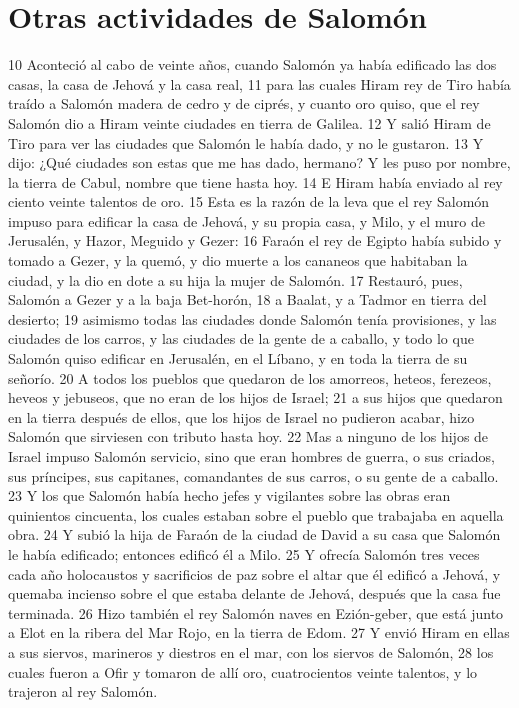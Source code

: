 \section*{Otras actividades de Salomón}

 
10 Aconteció al cabo de veinte años, cuando Salomón ya había edificado las dos casas, la casa de Jehová y la casa real,
11 para las cuales Hiram rey de Tiro había traído a Salomón madera de cedro y de ciprés, y cuanto oro quiso, que el rey Salomón dio a Hiram veinte ciudades en tierra de Galilea.
12 Y salió Hiram de Tiro para ver las ciudades que Salomón le había dado, y no le gustaron.
13 Y dijo: ¿Qué ciudades son estas que me has dado, hermano? Y les puso por nombre, la tierra de Cabul, nombre que tiene hasta hoy.
14 E Hiram había enviado al rey ciento veinte talentos   de oro.
15 Esta es la razón de la leva que el rey Salomón impuso para edificar la casa de Jehová, y su propia casa, y Milo, y el muro de Jerusalén, y Hazor, Meguido y Gezer:
16 Faraón el rey de Egipto había subido y tomado a Gezer, y la quemó, y dio muerte a los cananeos que habitaban la ciudad, y la dio en dote a su hija la mujer de Salomón.
17 Restauró, pues, Salomón a Gezer y a la baja Bet-horón,
18 a Baalat, y a Tadmor en tierra del desierto;
19 asimismo todas las ciudades donde Salomón tenía provisiones, y las ciudades de los carros, y las ciudades de la gente de a caballo, y todo lo que Salomón quiso edificar en Jerusalén, en el Líbano, y en toda la tierra de su señorío.
20 A todos los pueblos que quedaron de los amorreos, heteos, ferezeos, heveos y jebuseos, que no eran de los hijos de Israel;
21 a sus hijos que quedaron en la tierra después de ellos, que los hijos de Israel no pudieron acabar, hizo Salomón que sirviesen con tributo hasta hoy.
22 Mas a ninguno de los hijos de Israel impuso Salomón servicio, sino que eran hombres de guerra, o sus criados, sus príncipes, sus capitanes, comandantes de sus carros, o su gente de a caballo.
23 Y los que Salomón había hecho jefes y vigilantes sobre las obras eran quinientos cincuenta, los cuales estaban sobre el pueblo que trabajaba en aquella obra.
24 Y subió la hija de Faraón de la ciudad de David a su casa que Salomón le había edificado; entonces edificó él a Milo.
25 Y ofrecía Salomón tres veces cada año holocaustos y sacrificios de paz sobre el altar que él edificó a Jehová, y quemaba incienso sobre el que estaba delante de Jehová, después que la casa fue terminada.
26 Hizo también el rey Salomón naves en Ezión-geber, que está junto a Elot en la ribera del Mar Rojo, en la tierra de Edom.
27 Y envió Hiram en ellas a sus siervos, marineros y diestros en el mar, con los siervos de Salomón,
28 los cuales fueron a Ofir y tomaron de allí oro, cuatrocientos veinte talentos,  y lo trajeron al rey Salomón.

